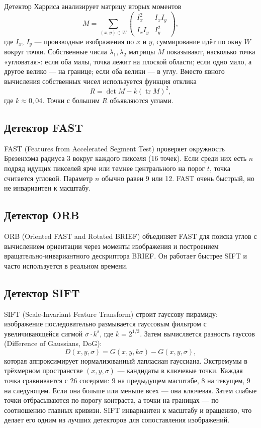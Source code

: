 \documentclass[a4paper,12pt]{article}
\begin{document}
Детектор Харриса анализирует матрицу вторых моментов
\[
M = \sum_{(x, y) \in W} \begin{pmatrix} I_x^2 & I_x I_y \\ I_x I_y & I_y^2 \end{pmatrix},
\]
где $I_x$, $I_y$ --- производные изображения по $x$ и $y$, суммирование идёт по окну $W$ вокруг точки. Собственные числа $\lambda_1, \lambda_2$ матрицы $M$ показывают, насколько точка «угловатая»: если оба малы, точка лежит на плоской области; если одно мало, а другое велико --- на границе; если оба велики --- в углу. Вместо явного вычисления собственных чисел используется функция отклика
\[
R = \det M - k (\operatorname{tr} M)^2,
\]
где $k \approx 0{,}04$. Точки с большим $R$ объявляются углами.

\subsection{Детектор FAST}

FAST (Features from Accelerated Segment Test) проверяет окружность Брезенхэма радиуса 3 вокруг каждого пикселя (16 точек). Если среди них есть $n$ подряд идущих пикселей ярче или темнее центрального на порог $t$, точка считается угловой. Параметр $n$ обычно равен 9 или 12. FAST очень быстрый, но не инвариантен к масштабу.

\subsection{Детектор ORB}

ORB (Oriented FAST and Rotated BRIEF) объединяет FAST для поиска углов с вычислением ориентации через моменты изображения и построением вращательно-инвариантного дескриптора BRIEF. Он работает быстрее SIFT и часто используется в реальном времени.

\subsection{Детектор SIFT}

SIFT (Scale-Invariant Feature Transform) строит гауссову пирамиду: изображение последовательно размывается гауссовым фильтром с увеличивающейся сигмой $\sigma \cdot k^s$, где $k = 2^{1/3}$. Затем вычисляется разность гауссов (Difference of Gaussians, DoG):
\[
D(x, y, \sigma) = G(x, y, k\sigma) - G(x, y, \sigma),
\]
которая аппроксимирует нормализованный лапласиан гауссиана. Экстремумы в трёхмерном пространстве $(x, y, \sigma)$ --- кандидаты в ключевые точки. Каждая точка сравнивается с $26$ соседями: $9$ на предыдущем масштабе, $8$ на текущем, $9$ на следующем. Если она больше или меньше всех --- она ключевая. Затем слабые точки отбрасываются по порогу контраста, а точки на границах --- по соотношению главных кривизн. SIFT инвариантен к масштабу и вращению, что делает его одним из лучших детекторов для сопоставления изображений.
\end{document}

